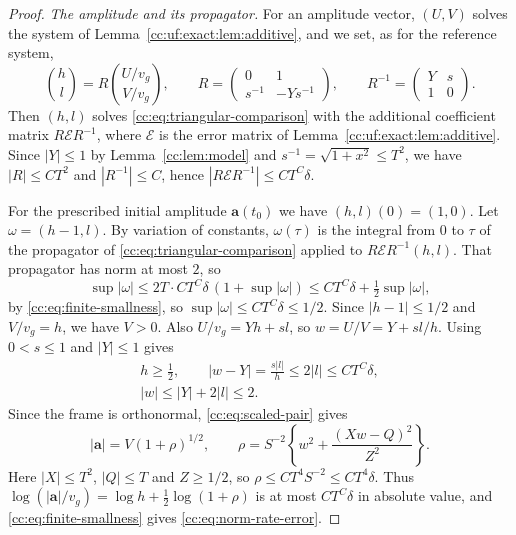 \begin{proof}
\emph{The amplitude and its propagator.} For an amplitude vector, $(U,V)$ solves
the system of Lemma~\ref{cc:uf:exact:lem:additive}, and we set, as for
the reference system,
\[
 \binom hl=R\binom{U/v_g}{V/v_g},\qquad
 R=\begin{pmatrix}0&1\\ s^{-1}&-Ys^{-1}\end{pmatrix},\qquad
 R^{-1}=\begin{pmatrix}Y&s\\ 1&0\end{pmatrix}.
\]
Then $(h,l)$ solves \eqref{cc:eq:triangular-comparison} with the
additional coefficient matrix $R\mathcal ER^{-1}$, where $\mathcal E$
is the error matrix of Lemma~\ref{cc:uf:exact:lem:additive}. Since
$|Y|\le1$ by Lemma~\ref{cc:lem:model} and
$s^{-1}=\sqrt{1+x^2}\le T^2$, we have $|R|\le CT^2$ and
$|R^{-1}|\le C$, hence $|R\mathcal ER^{-1}|\le CT^C\delta$.

For the prescribed initial amplitude $\mathbf a(t_0)$ we have
$(h,l)(0)=(1,0)$. Let $\omega=(h-1,l)$. By variation of
constants, $\omega(\tau)$ is the integral from $0$ to $\tau$ of the
propagator of \eqref{cc:eq:triangular-comparison} applied to
$R\mathcal ER^{-1}(h,l)$. That propagator has norm at most $2$, so
\[
 \sup|\omega|\le2T\cdot CT^C\delta\,(1+\sup|\omega|)
 \le CT^C\delta+\tfrac12\sup|\omega|,
\]
by \eqref{cc:eq:finite-smallness}, so $\sup|\omega|\le CT^C\delta\le1/2$.
Since $|h-1|\le1/2$ and $V/v_g=h$, we have $V>0$.
Also $U/v_g=Yh+sl$, so $w=U/V=Y+sl/h$. Using $0<s\le1$ and
$|Y|\le1$ gives
\begin{equation}\label{cc:eq:amplitude-comparison}
 \begin{gathered}
 h\ge\tfrac12,\qquad
 |w-Y|=\frac{s|l|}{h}\le2|l|\le CT^C\delta,\\
 |w|\le|Y|+2|l|\le2.
 \end{gathered}
\end{equation}
Since the frame is orthonormal, \eqref{cc:eq:scaled-pair} gives
\[
 |\mathbf a|=V(1+\rho)^{1/2},\qquad
 \rho=S^{-2}\left\{w^2+\frac{(Xw-Q)^2}{Z^2}\right\}.
\]
Here $|X|\le T^2$, $|Q|\le T$ and $Z\ge1/2$, so
$\rho\le CT^4S^{-2}\le CT^4\delta$. Thus
$\log(|\mathbf a|/v_g)=\log h+\tfrac12\log(1+\rho)$ is at most
$CT^C\delta$ in absolute value, and \eqref{cc:eq:finite-smallness}
gives \eqref{cc:eq:norm-rate-error}.


\end{proof}
